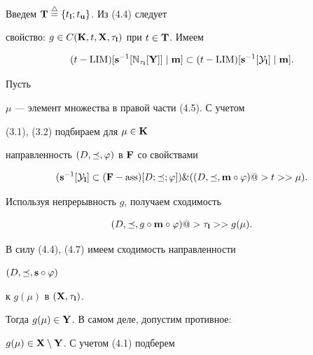 \begin{pf}


Введем ${\bold T} \stac \{{t_{\bold l}};


{t_{\bold u}}\}$. Из (4.4) следует


свойство: $g \in C({\bold K},t,{\bold X},


{{\tau}_{\bold l}})$ при $t \in {\bold T}$. Имеем


\begin{equation}


(t - {\LIM})[{{\bold s}^{-1}}


[{{\Bbb N}_{{\tau}_{\bold l}}}[{\bold Y}]] \mid


{\bold m}] \subset (t - {\LIM})[{{\bold s}^{-1}}


[{\cal Y}_{\bold l}] \mid {\bold m}].


\end{equation}


Пусть


$\mu$ --- элемент множества в правой части (4.5). С учетом


(3.1), (3.2) подбираем для $\mu \in {\bold K}$


направленность $(D,\preceq,\varphi)$ в ${\bold F}$ со свойствами


\begin{equation}


({{\bold s}^{-1}}[{\cal Y}_{\bold l}] \subset ({\bold F} -


{\ass})[D;\preceq;\vp])


\& ((D,\preceq,{\bold m} \circ \vp) @>{t}>>  \mu).


\end{equation}


Используя непрерывность $g$, получаем сходимость


\begin{equation}


(D,\preceq,g \circ {\bold m} \circ \vp) @>{{\tau}_{\bold l}}>> g(\mu).


\end{equation}


В силу (4.4), (4.7) имеем сходимость направленности


$(D,\preceq,{\bold s} \circ \varphi)$


к $g(\mu)$ в $({\bold X},{{\tau}_{\bold l}})$.


Тогда ${g(\mu)} \in {\bold Y}$. В самом деле, допустим противное:


${g(\mu)} \in {\bold X} \setminus {\bold Y}$. С учетом (4.1) подберем



\end{pf}
